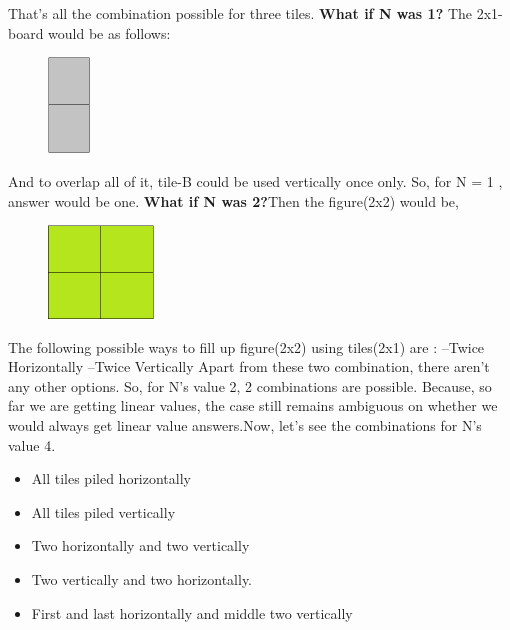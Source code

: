 \documentclass[12pt]{article}
\begin{document}
{\begin{itemize}
\end{itemize}
That’s all the combination possible for three tiles. \vspace{2mm}\newline  
\textbf{What if N was 1?}\newline
The 2x1- board would be as follows: 
\begin{figure}[H]
\centering
\includegraphics[width=0.10\textwidth]{2x1B.png}
\end{figure}
And to overlap all of it, tile-B could be used vertically once only. So, for N = 1 , answer would be one.\newline
\textbf{What if N was 2?}\newline Then the figure(2x2) would be,
\begin{figure}[H]
\centering
\includegraphics[width=0.25\textwidth]{2x2.png}
\end{figure}
The following possible ways to fill up figure(2x2) using tiles(2x1) are :\newline
--Twice Horizontally\newline
--Twice Vertically\newline
Apart from these two combination, there aren’t any other options. So, for N’s value 2, 2 combinations are possible. 
Because, so far we are getting linear values, the case still remains ambiguous on whether we would always get linear value answers.\newline Now, let’s see the combinations for N’s value 4.
\begin{itemize}
\item All tiles piled horizontally
\item All tiles piled vertically
\item Two horizontally and two vertically
\item Two vertically and two horizontally.
\item First and last horizontally and middle two vertically

\end{itemize}}
\end{document}
